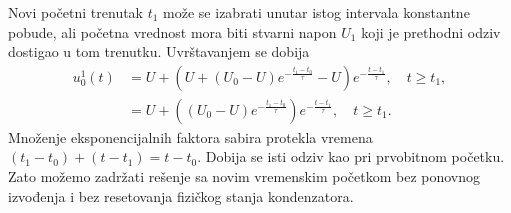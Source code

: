 Novi početni trenutak $t_1$ može se izabrati unutar istog intervala konstantne pobude, ali početna vrednost mora biti stvarni napon $U_1$ koji je prethodni odziv dostigao u tom trenutku. Uvrštavanjem se dobija
\begin{align*}
u_0^1(t)&=U+\left(U+(U_0-U)e^{-\frac{t_1-t_0}{\tau}}-U\right)e^{-\frac{t-t_1}{\tau}},\quad t\geq t_1,\\
&=U+\left((U_0-U)e^{-\frac{t_1-t_0}{\tau}}\right)e^{-\frac{t-t_1}{\tau}},\quad t\geq t_1.
\end{align*}
Množenje eksponencijalnih faktora sabira protekla vremena $(t_1-t_0)+(t-t_1)=t-t_0$. Dobija se isti odziv kao pri prvobitnom početku. Zato možemo zadržati rešenje sa novim vremenskim početkom bez ponovnog izvođenja i bez resetovanja fizičkog stanja kondenzatora.
